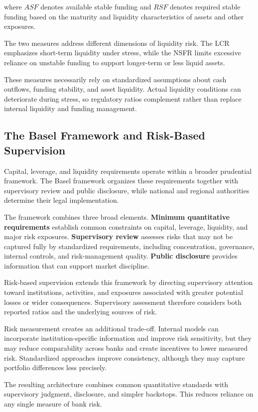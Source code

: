 where \(ASF\) denotes available stable funding and \(RSF\) denotes required stable funding based on the maturity and liquidity characteristics of assets and other exposures.

The two measures address different dimensions of liquidity risk. The LCR emphasizes short-term liquidity under stress, while the NSFR limits excessive reliance on unstable funding to support longer-term or less liquid assets.

These measures necessarily rely on standardized assumptions about cash outflows, funding stability, and asset liquidity. Actual liquidity conditions can deteriorate during stress, so regulatory ratios complement rather than replace internal liquidity and funding management.


\subsection{The Basel Framework and Risk-Based Supervision}

Capital, leverage, and liquidity requirements operate within a broader prudential framework. The Basel framework organizes these requirements together with supervisory review and public disclosure, while national and regional authorities determine their legal implementation.

The framework combines three broad elements. \textbf{Minimum quantitative requirements} establish common constraints on capital, leverage, liquidity, and major risk exposures. \textbf{Supervisory review} assesses risks that may not be captured fully by standardized requirements, including concentration, governance, internal controls, and risk-management quality. \textbf{Public disclosure} provides information that can support market discipline.

Risk-based supervision extends this framework by directing supervisory attention toward institutions, activities, and exposures associated with greater potential losses or wider consequences. Supervisory assessment therefore considers both reported ratios and the underlying sources of risk.

Risk measurement creates an additional trade-off. Internal models can incorporate institution-specific information and improve risk sensitivity, but they may reduce comparability across banks and create incentives to lower measured risk. Standardized approaches improve consistency, although they may capture portfolio differences less precisely.

The resulting architecture combines common quantitative standards with supervisory judgment, disclosure, and simpler backstops. This reduces reliance on any single measure of bank risk.

